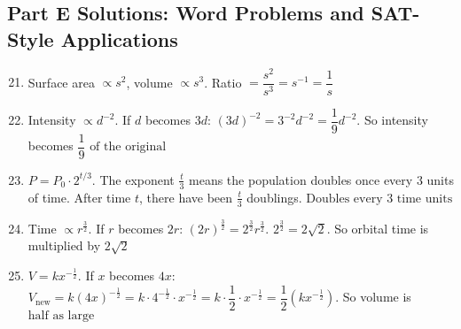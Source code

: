\documentclass[12pt]{article}
\begin{document}
\subsection*{Part E Solutions: Word Problems and SAT-Style Applications}
\begin{enumerate}
  \setcounter{enumi}{20}
  \item Surface area \(\propto s^2\), volume \(\propto s^3\).  
  Ratio \(= \dfrac{s^2}{s^3} = s^{-1} = \boxed{\dfrac{1}{s}}\)

  \item Intensity \(\propto d^{-2}\).  
  If \(d\) becomes \(3d\): \((3d)^{-2} = 3^{-2} d^{-2} = \dfrac{1}{9} d^{-2}\).  
  So intensity becomes \(\boxed{\dfrac{1}{9}\text{ of the original}}\)

  \item \(P = P_0 \cdot 2^{t/3}\).  
  The exponent \(\frac{t}{3}\) means the population doubles once every 3 units of time.  
  After time \(t\), there have been \(\frac{t}{3}\) doublings.  
  \(\boxed{\text{Doubles every 3 time units}}\)

  \item Time \(\propto r^{\frac{3}{2}}\).  
  If \(r\) becomes \(2r\): \((2r)^{\frac{3}{2}} = 2^{\frac{3}{2}} r^{\frac{3}{2}}\).  
  \(2^{\frac{3}{2}} = 2 \sqrt{2}\).  
  So orbital time is multiplied by \(\boxed{2\sqrt{2}}\)

  \item \(V = kx^{-\frac{1}{2}}\).  
  If \(x\) becomes \(4x\):  
  \(V_{\text{new}} = k(4x)^{-\frac{1}{2}} = k \cdot 4^{-\frac{1}{2}} \cdot x^{-\frac{1}{2}}
  = k \cdot \dfrac{1}{2} \cdot x^{-\frac{1}{2}}
  = \dfrac{1}{2} (kx^{-\frac{1}{2}})\).  
  So volume is \(\boxed{\text{half as large}}\)
\end{enumerate}
\end{document}
